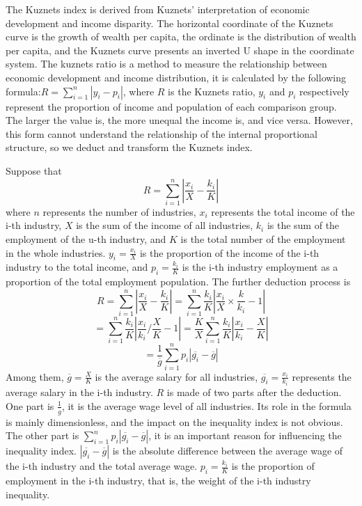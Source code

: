 \documentclass[12pt, titlepage]{article}
\begin{document}
The Kuznets index is derived from Kuznets' interpretation of economic
development and income disparity. The horizontal coordinate of the
Kuznets curve is the growth of wealth per capita, the ordinate is the
distribution of wealth per capita, and the Kuznets curve presents an
inverted U shape in the coordinate system. The kuznets ratio is a
method to measure the relationship between economic development and
income distribution, it is calculated by the following
formula:$R=\sum_{i=1}^n\left|y_{i}-p_{i}\right|$, where $R$ is the
Kuznets ratio, $y_{i}$ and $p_{i}$ respectively represent the
proportion of income and population of each comparison group. The
larger the value is, the more unequal the income is, and vice
versa. However, this form cannot understand the relationship of the
internal proportional structure, so we deduct and transform the
Kuznets index.

Suppose
that $$R=\sum_{i=1}^n\left|\frac{x_{i}}{X} - \frac{k_{i}}{K}\right|$$
where $n$ represents the number of industries, $x_{i}$ represents the
total income of the i-th industry, $X$ is the sum of the income of all
industries, $k_{i}$ is the sum of the employment of the u-th industry,
and $K$ is the total number of the employment in the whole
industries. $y_{i}=\frac{x_{i}}{X}$ is the proportion of the income of
the i-th industry to the total income, and $p_{i}=\frac{k_{i}}{K}$ is
the i-th industry employment as a proportion of the total employment
population. The further deduction process is
$$R=\sum_{i=1}^n\left|\frac{x_{i}}{X}-\frac{k_{i}}{K}\right|=\sum_{i=1}^n\frac{k_{i}}{K}\left|\frac{x_{i}}{X}\times\frac{k}{k_{i}}-1\right|$$
$$=\sum_{i=1}^n\frac{k_{i}}{K}\left|\frac{x_{i}}{k_{i}}/\frac{X}{K}-1\right|=\frac{K}{X}\sum_{i=1}^n\frac{k_{i}}{K}\left|\frac{x_{i}}{k_{i}}-\frac{X}{K}\right|$$
$$=\frac{1}{\overline{g}}\sum_{i=1}^np_{i}\left|\overline{g_{i}}-\overline{g}\right|$$
Among them, $\overline{g}=\frac{X}{K}$ is the average salary for all
industries, $\overline{g_{i}}=\frac{x_{i}}{k_{i}}$ represents the
average salary in the i-th industry. $R$ is made of two parts after
the deduction. One part is $\frac{1}{\overline{g}}$, it is the average
wage level of all industries. Its role in the formula is mainly
dimensionless, and the impact on the inequality index is not
obvious. The other part is
$\sum_{i=1}^np_{i}\left|\overline{g_{i}}-\overline{g}\right|$, it is
an important reason for influencing the inequality
index. $\left|\overline{g_{i}}-\overline{g}\right|$ is the absolute
difference between the average wage of the i-th industry and the total
average wage. $p_{i}=\frac{k_{i}}{K}$ is the proportion of employment
in the i-th industry, that is, the weight of the i-th industry
inequality.
\end{document}
